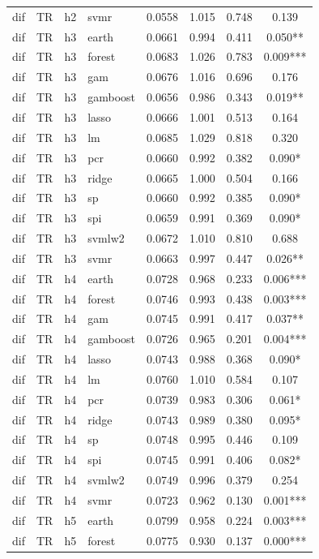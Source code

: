 \begin{ThreePartTable}
\begin{longtable}[t]{llclcccc}
dif & TR & h2 & svmr & 0.0558 & 1.015 & 0.748 & 0.139\\
\addlinespace
dif & TR & h3 & earth & 0.0661 & 0.994 & 0.411 & 0.050**\\
dif & TR & h3 & forest & 0.0683 & 1.026 & 0.783 & 0.009***\\
dif & TR & h3 & gam & 0.0676 & 1.016 & 0.696 & 0.176\\
dif & TR & h3 & gamboost & 0.0656 & 0.986 & 0.343 & 0.019**\\
dif & TR & h3 & lasso & 0.0666 & 1.001 & 0.513 & 0.164\\
dif & TR & h3 & lm & 0.0685 & 1.029 & 0.818 & 0.320\\
dif & TR & h3 & pcr & 0.0660 & 0.992 & 0.382 & 0.090*\\
dif & TR & h3 & ridge & 0.0665 & 1.000 & 0.504 & 0.166\\
dif & TR & h3 & sp & 0.0660 & 0.992 & 0.385 & 0.090*\\
dif & TR & h3 & spi & 0.0659 & 0.991 & 0.369 & 0.090*\\
dif & TR & h3 & svmlw2 & 0.0672 & 1.010 & 0.810 & 0.688\\
dif & TR & h3 & svmr & 0.0663 & 0.997 & 0.447 & 0.026**\\
\addlinespace
dif & TR & h4 & earth & 0.0728 & 0.968 & 0.233 & 0.006***\\
dif & TR & h4 & forest & 0.0746 & 0.993 & 0.438 & 0.003***\\
dif & TR & h4 & gam & 0.0745 & 0.991 & 0.417 & 0.037**\\
dif & TR & h4 & gamboost & 0.0726 & 0.965 & 0.201 & 0.004***\\
dif & TR & h4 & lasso & 0.0743 & 0.988 & 0.368 & 0.090*\\
dif & TR & h4 & lm & 0.0760 & 1.010 & 0.584 & 0.107\\
dif & TR & h4 & pcr & 0.0739 & 0.983 & 0.306 & 0.061*\\
dif & TR & h4 & ridge & 0.0743 & 0.989 & 0.380 & 0.095*\\
dif & TR & h4 & sp & 0.0748 & 0.995 & 0.446 & 0.109\\
dif & TR & h4 & spi & 0.0745 & 0.991 & 0.406 & 0.082*\\
dif & TR & h4 & svmlw2 & 0.0749 & 0.996 & 0.379 & 0.254\\
dif & TR & h4 & svmr & 0.0723 & 0.962 & 0.130 & 0.001***\\
\addlinespace
dif & TR & h5 & earth & 0.0799 & 0.958 & 0.224 & 0.003***\\
dif & TR & h5 & forest & 0.0775 & 0.930 & 0.137 & 0.000***\\

\end{longtable}
\end{ThreePartTable}
